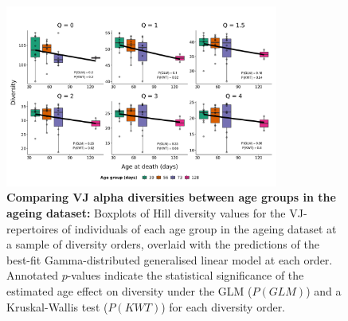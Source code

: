 \begin{figure}
\centering
\includegraphics[width = 0.8\textwidth]{_Figures/png/ageing-VJ-diversity-solo-fit-gamma}
\caption[Comparing VJ alpha diversities between age groups in the \igseq ageing dataset]{\textbf{Comparing VJ alpha diversities between age groups in the \igseq ageing dataset:} Boxplots of Hill diversity values for the VJ-repertoires of individuals of each age group in the \igseq ageing dataset at a sample of diversity orders, overlaid with the predictions of the best-fit Gamma-distributed generalised linear model at each order.  Annotated $p$-values indicate the statistical significance of the estimated age effect on diversity under the GLM ($P(GLM)$) and a Kruskal-Wallis test ($P(KWT)$) for each diversity order.}
\label{fig:igseq-ageing-VJ-diversity-solo-fit-gamma}
\end{figure}

